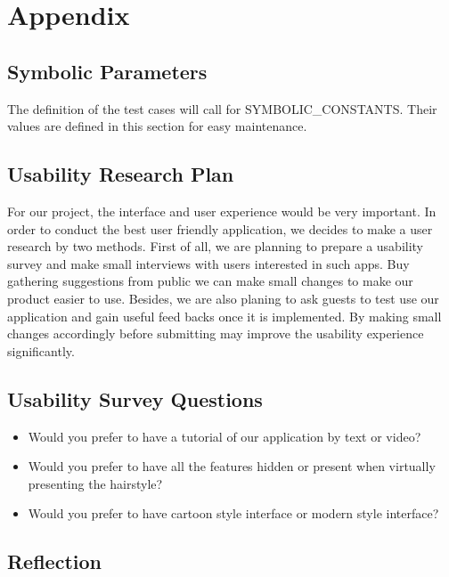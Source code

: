 \documentclass[12pt, titlepage]{article}
\begin{document}
				


% 

\newpage

\section{Appendix}

\subsection{Symbolic Parameters}

The definition of the test cases will call for SYMBOLIC\_CONSTANTS.
Their values are defined in this section for easy maintenance.
\subsection{Usability Research Plan}
For our project, the interface and user experience would be very important. In order to conduct the best user friendly application, we decides to make a user research by two methods. First of all, we are planning to prepare a usability survey and make small interviews with users interested in such apps. Buy gathering suggestions from public we can make small changes to make our product easier to use. Besides, we are also planing to ask guests to test use our application and gain useful feed backs once it is implemented. By making small changes accordingly before submitting may improve the usability experience significantly.
\subsection{Usability Survey Questions}
\begin{itemize}
    \item Would you prefer to have a tutorial of our application by text or video?
    \item Would you prefer to have all the features hidden or present when virtually presenting the hairstyle?
    \item Would you prefer to have cartoon style interface or modern style interface? 
\end{itemize}


\newpage{}
\subsection{Reflection}
\end{document}
